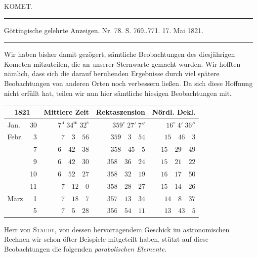 \clearpage
{}
\hypertarget{native-442-part-lower}{}
\begin{center}
{\large KOMET.}

\noindent\rule{\linewidth}{0.4pt}

Göttingische gelehrte Anzeigen. Nr. 78. S. 769..771. 17. Mai 1821.

\noindent\rule{\linewidth}{0.4pt}
\end{center}

Wir haben bisher damit gezögert, sämtliche Beobachtungen des diesjährigen Kometen mitzuteilen, die an unserer Sternwarte gemacht wurden. Wir hofften nämlich, dass sich die darauf beruhenden Ergebnisse durch viel spätere Beobachtungen von anderen Orten noch verbessern ließen. Da sich diese Hoffnung nicht erfüllt hat, teilen wir nun hier sämtliche hiesigen Beobachtungen mit.

\begin{center}
\begin{tabular}{lr|r|r|r}
\multicolumn{2}{c|}{1821} & Mittlere Zeit & Rektaszension & Nördl. Dekl. \\
\hline
Jan. & 30 & $7^{\mathrm{u}}\;34^{\mathrm{m}}\;32^{\mathrm{s}}$ & $359^\circ\;27'\;7''$ & $16^\circ\;4'\;36''$ \\
Febr. & 3 & $7\quad3\quad56$ & $359\quad3\quad54$ & $15\quad46\quad3$ \\
& 7 & $6\quad42\quad38$ & $358\quad45\quad5$ & $15\quad29\quad49$ \\
& 9 & $6\quad42\quad30$ & $358\quad36\quad24$ & $15\quad21\quad22$ \\
& 10 & $6\quad52\quad27$ & $358\quad32\quad19$ & $16\quad17\quad50$ \\
& 11 & $7\quad12\quad0$ & $358\quad28\quad27$ & $15\quad14\quad26$ \\
März & 1 & $7\quad18\quad7$ & $357\quad13\quad34$ & $14\quad8\quad37$ \\
& 5 & $7\quad5\quad28$ & $356\quad54\quad11$ & $13\quad43\quad5$ \\
\end{tabular}
\end{center}

Herr von \textsc{Staudt}, von dessen hervorragendem Geschick im astronomischen Rechnen wir schon öfter Beispiele mitgeteilt haben, stützt auf diese Beobachtungen die folgenden \emph{parabolischen Elemente}.

